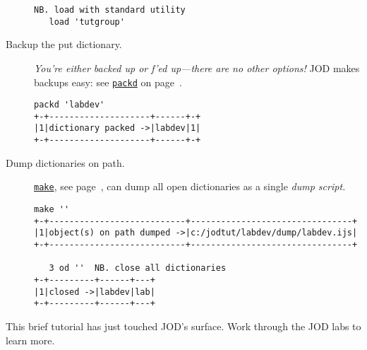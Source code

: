 \begin{description}
\begin{lstlisting}[frame=single,framerule=0pt]
   NB. load with standard utility
   load 'tutgroup'  
\end{lstlisting}

\item[Backup the put dictionary.] \emph{You're either backed up or f'ed up---there are
no other options!} JOD makes backups 
easy: see \hyperlink{il:packd}{\texttt{packd}} on page~\pageref{ss:packd}.
\begin{lstlisting}[frame=single,framerule=0pt] 
   packd 'labdev'
+-+--------------------+------+-+
|1|dictionary packed ->|labdev|1|
+-+--------------------+------+-+
\end{lstlisting}

\item[Dump dictionaries on path.] \hyperlink{il:make}{\texttt{make}}, see page~\pageref{ss:make},
can dump all open dictionaries as a single \emph{dump script.}
\begin{lstlisting}[frame=single,framerule=0pt]
   make ''
+-+---------------------------+--------------------------------+
|1|object(s) on path dumped ->|c:/jodtut/labdev/dump/labdev.ijs|
+-+---------------------------+--------------------------------+

   3 od '' 	NB. close all dictionaries
+-+---------+------+---+
|1|closed ->|labdev|lab|
+-+---------+------+---+
\end{lstlisting}

\end{description}

This brief tutorial has just touched JOD's surface.  Work through the JOD labs to learn more.
